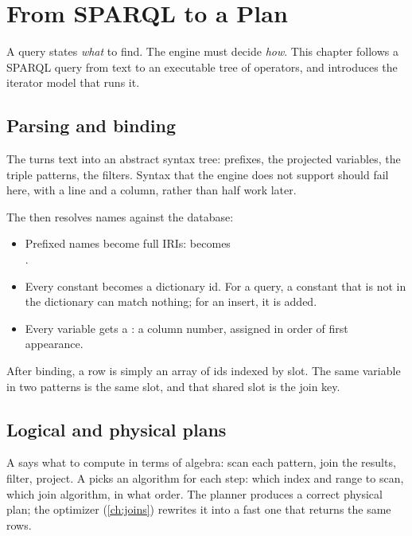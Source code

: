 \chapter{From SPARQL to a Plan}
\label{ch:plans}

A query states \emph{what} to find. The engine must decide \emph{how}. This
chapter follows a SPARQL query from text to an executable tree of operators,
and introduces the iterator model that runs it.

\section{Parsing and binding}

The  turns text into an abstract syntax tree: prefixes, the
projected variables, the triple patterns, the filters. Syntax that the engine
does not support should fail here, with a line and a column, rather than half
work later.

The  then resolves names against the database:

\begin{itemize}
\item Prefixed names become full IRIs:  becomes\\ .
\item Every constant becomes a dictionary id. For a query, a constant that is not in the dictionary can match nothing; for an insert, it is added.
\item Every variable gets a : a column number, assigned in order of first appearance.
\end{itemize}

After binding, a row is simply an array of ids indexed by slot. The same
variable in two patterns is the same slot, and that shared slot is the join key.

\section{Logical and physical plans}

A  says what to compute in terms of algebra: scan each
pattern, join the results, filter, project. A  picks an
algorithm for each step: which index and range to scan, which join algorithm,
in what order. The planner produces a correct physical plan; the optimizer
(\cref{ch:joins}) rewrites it into a fast one that returns the same rows.

